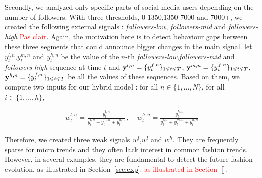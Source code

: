 \documentclass{article} %
\newcommand{\ts}{y}
\newcommand{\fullts}{{\bf \ts}}
\newcommand{\lag}{h}
\newcommand{\ws}{w}
\begin{document}
Secondly, we analyzed only specific parts of social media users depending on the number of followers. With three thresholds, 0-1350,1350-7000 and 7000+, we created the following external signals : \textit{followers-low}, \textit{followers-mid} and \textit{followers-high} \textcolor{red}{Pas clair}. Again, the motivation here is to detect behaviour gaps between these three segments that could announce bigger changes in the main signal. let $\ts_t^{l,n}$,$\ts_t^{m,n}$ and $\ts_t^{h,n}$ be the value of the $n$-th \textit{followers-low},\textit{followers-mid} and \textit{followers-high} sequence at time $t$ and  $\fullts^{l,n} = \{\ts_t^{f,n}\}_{1\leqslant t \leqslant T}$, $\fullts^{m,n} = \{\ts_t^{f,n}\}_{1\leqslant t \leqslant T}$, $\fullts^{h,n} = \{\ts_t^{f,n}\}_{1\leqslant t \leqslant T}$ be all the values of these sequences. Based on them, we compute two inputs for our hybrid model : for all $n \in \{1,\ldots,N\}$, for all $i \in \{1,\ldots,\lag\}$,

\begin{align*}
\ws^{l,n}_{t} = \frac{\ts_t^{l,n}}{\ts_t^{l,n}+\ts_t^{m,n}+\ts_t^{h,n}}\,,\quad \ws^{h,n}_{t} = \frac{\ts_t^{h,n}}{\ts_t^{l,n}+\ts_t^{m,n}+\ts_t^{h,n}}
\end{align*}


Therefore, we created three weak signals $\ws^{l}$,$\ws^{l}$ and $\ws^{h}$. They are frequently sparse for micro trends and they often lack interest in common fashion trends. However, in several examples, they are fundamental to detect the future fashion evolution, as illustrated in Section~\ref{sec:exp}. \textcolor{red}{as illustrated in Section~\ref{}}.









\end{document}
